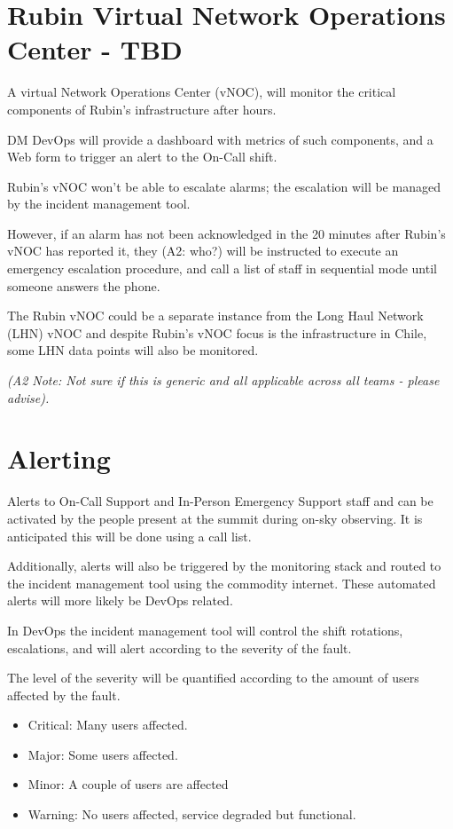 \section{Rubin Virtual Network Operations Center - TBD}

A virtual Network Operations Center (vNOC), will monitor the critical components of Rubin's infrastructure after hours.

DM DevOps will provide a dashboard with metrics of such components, and a Web form to trigger an alert to the On-Call shift.

Rubin's vNOC won't be able to escalate alarms; the escalation will be managed by the incident management tool.

However, if an alarm has not been acknowledged in the 20 minutes after Rubin's vNOC has reported it, they (A2: who?) will be instructed to execute an emergency escalation procedure, and call a list of staff in sequential mode until someone answers the phone.

The Rubin vNOC could be a separate instance from the Long Haul Network (LHN) vNOC and despite Rubin's vNOC focus is the infrastructure in Chile, some LHN data points will also be monitored.

\textit{
(A2 Note:  Not sure if this is generic and all applicable across all teams - please advise).}

\section{Alerting}

Alerts to On-Call Support and In-Person Emergency Support staff and can be activated by the people present at the summit during on-sky observing.  
It is anticipated this will be done using a call list.

Additionally, alerts will also be triggered by the monitoring stack and routed to the incident management tool using the commodity internet.  
These automated alerts will more likely be DevOps related.

In DevOps the incident management tool will control the shift rotations, escalations, and will alert according to the severity of the fault.

The level of the severity will be quantified according to the amount of users affected by the fault.

\begin{itemize}
    \item Critical: Many users affected.
    \item Major: Some users affected.
    \item Minor: A couple of users are affected
    \item Warning: No users affected, service degraded but functional.
\end{itemize}

